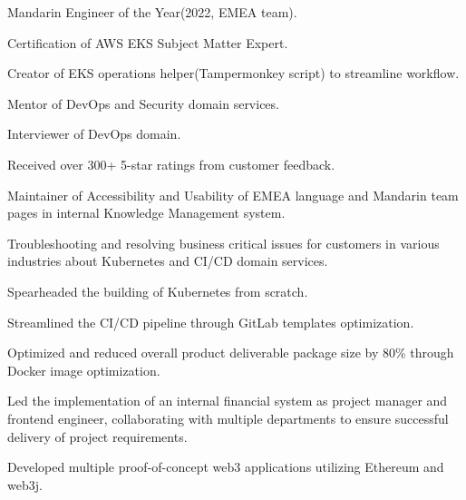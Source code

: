 \documentclass[]{deedy-resume-openfont}
\begin{document}
\begin{minipage}[t]{1\textwidth}
\null\hfill{}
\begin{tightemize}
    \item Mandarin Engineer of the Year(2022, EMEA team).
    \item Certiﬁcation of AWS EKS Subject Matter Expert.
    \item Creator of EKS operations helper(Tampermonkey script) to streamline workﬂow.
    \item Mentor of DevOps and Security domain services.
    \item Interviewer of DevOps domain.
    \item Received over 300+ 5-star ratings from customer feedback.
    \item Maintainer of Accessibility and Usability of EMEA language and Mandarin team pages in internal Knowledge Management system.
    \item Troubleshooting and resolving business critical issues for customers in various industries about Kubernetes and CI/CD domain services.
\end{tightemize}
\sectionsep

\null\hfill{}
\begin{tightemize}
    \item Spearheaded the building of Kubernetes from scratch.
    \item Streamlined the CI/CD pipeline through GitLab templates optimization.
    \item Optimized and reduced overall product deliverable package size by 80\% through Docker image optimization.
    \item Led the implementation of an internal financial system as project manager and frontend engineer, collaborating with multiple departments to ensure successful delivery of project requirements.
\end{tightemize}
\sectionsep

\null\hfill{}
\begin{tightemize}
    \item Developed multiple proof-of-concept web3 applications utilizing Ethereum and web3j.
\end{tightemize}
\sectionsep


\end{minipage}
\end{document}
